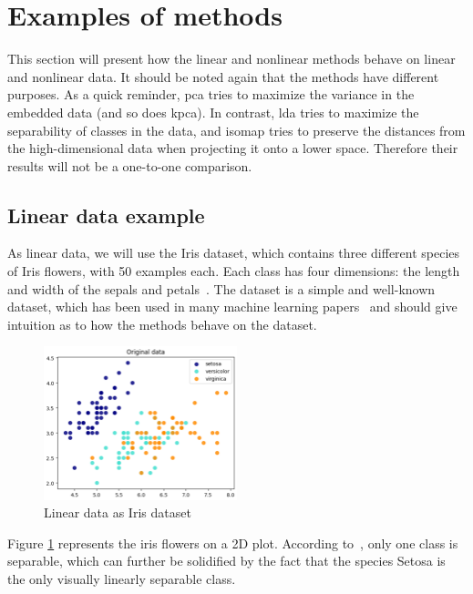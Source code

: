 \section{Examples of methods}\label{sec:examples-methods}
This section will present how the linear and nonlinear methods behave on linear and nonlinear data. It should be noted again that the methods have different purposes. As a quick reminder, \gls{pca} tries to maximize the variance in the embedded data (and so does \gls{kpca}). In contrast, \gls{lda} tries to maximize the separability of classes in the data, and \gls{isomap} tries to preserve the distances from the high-dimensional data when projecting it onto a lower space. Therefore their results will not be a one-to-one comparison.

\subsection{Linear data example}\label{subsec:linear-data-example}
As linear data, we will use the Iris dataset, which contains three different species of Iris flowers, with 50 examples each. Each class has four dimensions: the length and width of the sepals and petals~\cite{iris-dataset}. The dataset is a simple and well-known dataset, which has been used in many machine learning papers~\cite{iris-dataset} and should give intuition as to how the methods behave on the dataset.

\begin{figure}[htb!]
\centering
\includegraphics[width=0.5\textwidth]{figures/theory-example-figures/linear-data.png}
\caption{Linear data as Iris dataset}
\label{fig:linear-data}
\end{figure}

Figure \ref{fig:linear-data} represents the iris flowers on a 2D plot. According to~\cite{iris-dataset}, only one class is separable, which can further be solidified by the fact that the species Setosa is the only visually linearly separable class.

